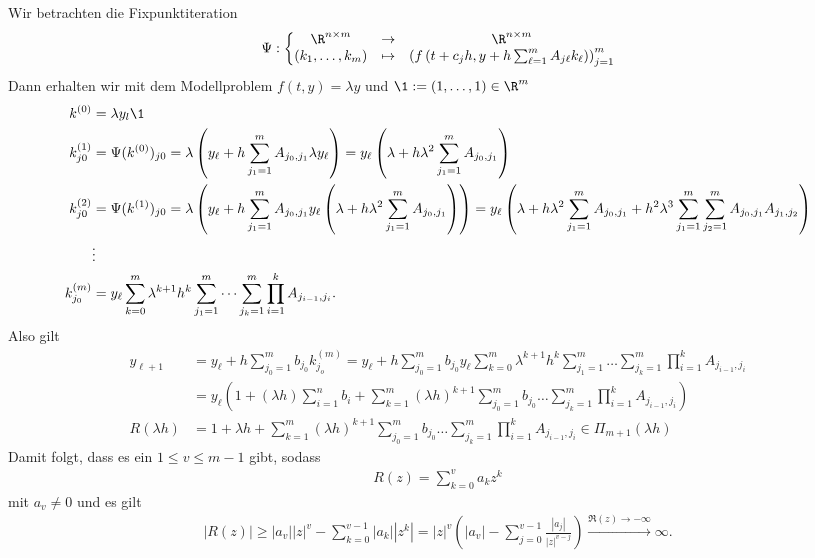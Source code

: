 \begin{solution}
Wir betrachten die Fixpunktiteration
\begin{align*}
  \Psi: \bigg\{\begin{matrix}
    \R^{n \times m} & \rightarrow & \R^{n \times m} \\
    (k_1,\dots,k_m) & \mapsto & \left(f\left(t + c_jh,y + h\sum_{\ell = 1}^m A_{j\ell}k_{\ell}\right)\right)_{j=1}^m
  \end{matrix}
\end{align*}
Dann erhalten wir mit dem Modellproblem $f(t,y) = \lambda y$ und $\1 := (1,\dots,1) \in \R^m$
\begin{align*}
  k^{(0)} &= \lambda y_l \1 \\
  k^{(1)}_{j0} &= \Psi(k^{(0)})_{j0}
  = \lambda\left(y_{\ell} + h\sum_{j_1 = 1}^mA_{j_0,j_1}\lambda y_{\ell}\right)
  = y_{\ell}\left(\lambda + h\lambda^2\sum_{j_1 = 1}^mA_{j_0,j_1}\right) \\
  k^{(2)}_{j0} &= \Psi(k^{(1)})_{j0}
  = \lambda\left(y_{\ell} + h\sum_{j_1 = 1}^mA_{j_0,j_1}y_{\ell}\left(\lambda + h\lambda^2
  \sum_{j_1 = 1}^mA_{j_0,j_1}\right)\right)
  = y_{\ell}\left(\lambda + h\lambda^2\sum_{j_1 = 1}^mA_{j_0,j_1}
  + h^2\lambda^3\sum_{j_1 = 1}^m\sum_{j_2 = 1}^m A_{j_0,j_1}A_{j_1,j_2}\right) \\
  &\vdots \\
  k^{(m)}_{j_0} &= y_{\ell}\sum_{k = 0}^m \lambda^{k+1}h^k\sum_{j_1 = 1}^m\dots\sum_{j_{k} = 1}^m
  \prod_{i=1}^k A_{j_{i-1}, j_i}.
\end{align*}
Also gilt
\begin{align*}
  y_{\ell+1} &= y_\ell + h\sum_{j_0 = 1}^{m} b_{j_0}k_{j_o}^{(m)} =
  y_\ell + h\sum_{j_0 = 1}^{m} b_{j_0}y_{\ell}\sum_{k = 0}^m \lambda^{k+1}h^k\sum_{j_1 = 1}^m\dots\sum_{j_{k} = 1}^m
  \prod_{i=1}^k A_{j_{i-1}, j_i} \\
  &= y_{\ell}\left(1 + (\lambda h)\sum_{i=1}^nb_i + \sum_{k=1}^m(\lambda h)^{k+1}
  \sum_{j_0 = 1}^mb_{j_0}\dots\sum_{j_k = 1}^m \prod_{i=1}^k A_{j_{i-1},j_i}\right) \\
  R(\lambda h) &= 1 + \lambda h + \sum_{k=1}^m(\lambda h)^{k+1}
  \sum_{j_0 = 1}^mb_{j_0}\dots\sum_{j_k = 1}^m \prod_{i=1}^k A_{j_{i-1},j_i}
  \in \Pi_{m+1}(\lambda h)
\end{align*}
Damit folgt, dass es ein $1 \leq v \leq m - 1$ gibt, sodass
\begin{align*}
  R(z) = \sum_{k= 0}^v a_kz^k
\end{align*}
mit $a_v \neq 0$ und es gilt
\begin{align*}
  |R(z)| \geq |a_v||z|^v - \sum_{k=0}^{v-1}|a_k||z^k|
  = |z|^v\left(|a_v| - \sum_{j = 0}^{v - 1}\frac{|a_j|}{|z|^{v - j}}\right)
  \stackrel{\Re(z) \rightarrow -\infty}{\longrightarrow} \infty.
\end{align*}
\end{solution}
